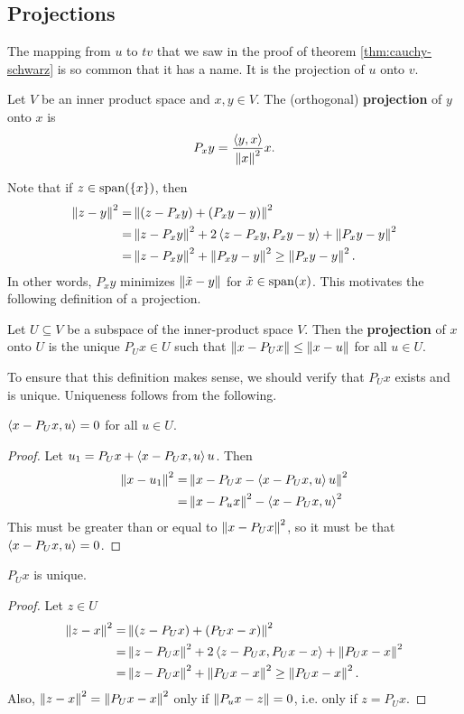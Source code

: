 \subsection{Projections}
The mapping from $u$ to $tv$ that we saw in the proof of theorem
\ref{thm:cauchy-schwarz} is so common that it has
a name. It is the projection of $u$ onto $v$. 
\begin{definition}
  Let $V$ be an inner product space and $x,y \in V$. The (orthogonal) 
  \textbf{projection} of $y$ onto $x$ is 
  \[ P_x y = \frac{\left\langle {y} , {x} \right\rangle}{\left\Vert {x} \right\Vert^2} x. \]
\end{definition}
Note that if $z \in \mathrm{span}(\{x\})$, then 
\begin{align*}
  \left\Vert {z - y} \right\Vert^2 = & \left\Vert { (z - P_x y) + (P_x y - y)} \right\Vert^2 \\
  = & \left\Vert { z - P_x y } \right\Vert^2+ 2\left\langle {z-P_x y} , {P_x y - y} \right\rangle + \left\Vert {P_x y
    - y} \right\Vert^2 \\
  = & \left\Vert { z - P_x y } \right\Vert^2+ \left\Vert {P_x y
    - y} \right\Vert^2 \geq \left\Vert {P_x y - y} \right\Vert^2.
\end{align*}
In other words, $P_x y$ minimizes $\left\Vert {\tilde{x} - y} \right\Vert$ for
$\tilde{x} \in \mathrm{span}(x)$. This motivates the following definition of a
projection.
\begin{definition}
  Let $U \subseteq V$ be a subspace of the inner-product space
  $V$. Then the \textbf{projection} of $x$ onto $U$ is the unique $P_U x
  \in U$ such that $\left\Vert {x - P_U x} \right\Vert \leq \left\Vert {x - u} \right\Vert$ for all $u \in
  U$. 
\end{definition}
To ensure that this definition makes sense, we should verify that $P_U
x$ exists and is unique. Uniqueness follows from the following.
\begin{lemma} \label{lem:orthoProj}
  $\left\langle {x-P_U x} , {u} \right\rangle = 0$ for all $u \in U$.
\end{lemma}
\begin{proof}
  Let $u_1 = P_U x + \left\langle {x-P_U x} , {u} \right\rangle u$. Then
  \begin{align*}
    \left\Vert {x - u_1} \right\Vert^2 = & \left\Vert {x - P_U x -  \left\langle {x-P_U x} , {u} \right\rangle u} \right\Vert^2 \\
    = & \left\Vert {x - P_u x} \right\Vert^2 - \left\langle {x-P_U x} , {u} \right\rangle^2 
  \end{align*}
  This must be greater than or equal to $\left\Vert {x - P_U x} \right\Vert^2$, so it must
  be that $\left\langle {x - P_U x} , {u} \right\rangle = 0$.
\end{proof}
\begin{lemma}
  $P_U x$ is unique.
\end{lemma}
\begin{proof}
  Let $z \in U$
  \begin{align*}
    \left\Vert {z - x} \right\Vert^2 = & \left\Vert { (z - P_U x) + (P_U x - x)} \right\Vert^2 \\
    = & \left\Vert { z - P_U x } \right\Vert^2+ 2\left\langle {z-P_U x} , {P_U x - x} \right\rangle + \left\Vert {P_U x
      - x} \right\Vert^2 \\
    = & \left\Vert { z - P_U x } \right\Vert^2+ \left\Vert {P_U x
      - x} \right\Vert^2 \geq \left\Vert {P_U x - x} \right\Vert^2.
  \end{align*}
  Also, $  \left\Vert {z - x} \right\Vert^2 = \left\Vert {P_U x - x} \right\Vert^2$ only if $\left\Vert {P_u x -
    z} \right\Vert=0$, i.e. only if $z = P_U x$.
\end{proof}
